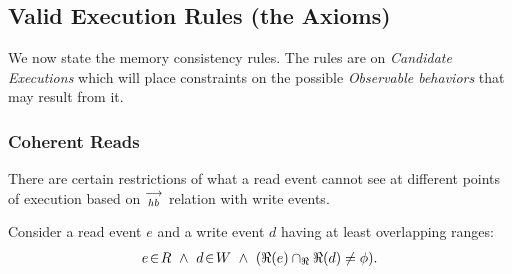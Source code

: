         
    \subsection{Valid Execution Rules (the Axioms)}
        We now state the memory consistency rules. The rules are on \textit{Candidate Executions} which will place constraints on the possible \textit{Observable behaviors} that may result from it. 
         
        \subsubsection{Coherent Reads} 
        
            There are certain restrictions of what a read event cannot see at different points of execution based on $\stackrel{\longrightarrow}{_{hb}}$ relation with write events. 

            Consider a read event $e$ and a write event $d$ having at least overlapping ranges:
            \begin{align*}
                \event{e}{R} \ \wedge \ 
                \event{d}{W} \ \wedge \
                (\Re(e) \cap_\Re \Re(d) \neq \phi).
            \end{align*}

